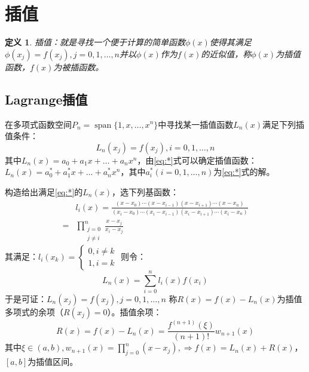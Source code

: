 \documentclass[a4paper]{article}
\newtheorem{definition}{定义}[section]
\DeclareMathOperator{\spn}{span}
\begin{document}
\section{插值}
\begin{definition}
    插值：就是寻找一个便于计算的简单函数$\phi(x)$使得其满足$\phi(x_j)=f(x_j), j=0,1,\dots, n$并以$\phi(x)$作为$f(x)$的近似值，称$\phi(x)$为插值函数，$f(x)$为被插函数。
\end{definition}

\subsection{Lagrange插值}
在多项式函数空间$P_n=\spn\{1,x,\dots, x^n\}$中寻找某一插值函数$L_n(x) $满足下列插值条件：
\begin{equation}
    L_n(x_j)=f(x_j), i=0,1,\dots, n 
    \label{eq:*}
\end{equation}
其中$L_n(x) = a_0 + a_1x + \dots+ a_nx^n$，由\ref{eq:*}式可以确定插值函数：$L_n(x)=a_0^* + a_1^*x + \dots+ a_n^*x^n $，其中$a_i^*(i=0,1,\dots, n)$为\ref{eq:*}式的解。

构造给出满足\ref{eq:*}的$L_n(x) $，选下列基函数：
\begin{equation}
    \begin{split}
        &l_i(x) = \frac{(x-x_0)\cdots(x-x_{i-1})(x-x_{i+1})\cdots(x-x_n)}{(x_i-x_0)\cdots(x_i-x_{i-1})(x_i-x_{i+1})\cdots(x_i-x_n)}\\
    =&\prod^n_{\substack{j=0\\j\neq i}}\frac{x-x_j}{x_i-x_j}
    \end{split}
\end{equation}
其满足：$l_i(x_k) = \left\{\begin{array}{lr}
    0, i\neq k \\ 1, i= k
\end{array}\right.$
则令：
\begin{equation}
    L_n(x) = \sum^n_{i=0}l_i(x)f(x_i)
\end{equation}
于是可证：$L_n(x_j)=f(x_j), j=0,1,\dots, n $
称$R(x)=f(x)-L_n(x) $为插值多项式的余项（$R(x_j)=0$）。插值余项：
$$R(x) = f(x)-L_n(x)=\frac{f^{(n+1)}(\xi)}{(n+1)!}w_{n+1}(x) $$
其中$\xi \in (a,b), w_{n+1}(x)=\prod^n_{j=0}(x-x_j) , \Rightarrow f(x)=L_n(x)+R(x) $，$[a,b]$为插值区间。
\end{document}
